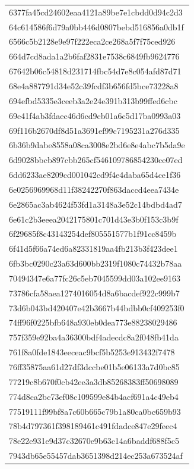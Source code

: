 \begin{tabular}{l}
6377fa45cd24602eaa4121a89be7e1cbdd0d94c2d3 \\
64c614586f6d79a0bb446d0807bebd516856a0db1f \\
6566c5b2128e9e97f222eca2ce268a5f7f75ced926 \\
664d7cd8ada1a2b6faf2831e7538c6849fb9624776 \\
67642b06c54818d231714fbc54d7e8c054afd87d71 \\
68e4a887791d34e52c39fcdf3b656fd5bce73228a8 \\
694efbd5335e3ceeb3a2e24e391b313b99ffed6cbc \\
69e41f4ab3fdaec46d6cd9cb01a6c5d17ba0993a03 \\
69f116b2670df8d51a3691ef99c7195231a276d335 \\
6b36b9dabe8558a08ca3008e2bd6e8e4abc7b5da9e \\
6d9028bbcb897cbb265cf546109786854230ce07ed \\
6dd6233ae8209cd001042cd9f4e4daba65d4ce1f36 \\
6e0256969968d11f38242270f863daccd4eea7434e \\
6e2865ac3ab4624f53fd1a3148a3e52c14bdbd4ad7 \\
6e61c2b3eeea2042175801c701d43e3b0f153c3b9f \\
6f29685f8c43143254def805551577b1f91cc8459b \\
6f41d5f66a74ed6a82331819aa4fb213b3f423dee1 \\
6fb3bc0290c23a63d600bb2319f1080c74432b78aa \\
70494347e6a77fc26c5eb7045599dd03a102ee9163 \\
73786cfa58aea1274016054d8a6bacdef922c999b7 \\
73d6b043bd420407e42b3667b44bdbb0cf409253f0 \\
74ff96f0225bfb648a930eb0dea773e88238029486 \\
757f359e92ba4a36300bdf4adecdc8a2f048fb41da \\
761f8a0fde1843eeceac9bcf5b5253e913432f7478 \\
76ff35875aa61d27df3dccbe01b5e06133a7d0bc85 \\
77219c8b670f0cb42ee3a3db85268383ff50698089 \\
774d8ca2bc73ef08c109599e84b4acf691a4c49eb4 \\
77519111f99bf8a7c60b665c79b1a80ca0bc659b93 \\
78b4d797361f398189461c491fdadce847e29feec4 \\
78e22e931e9d37c32670e9b63c14a6baddf688f5c5 \\
7943db65e55457dab3651398d214ec253a673524af \\

\end{tabular}
